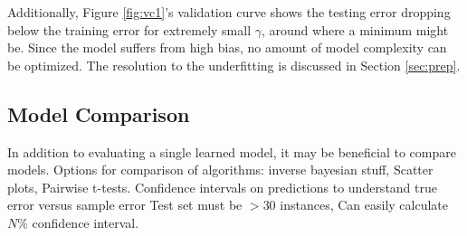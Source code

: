 Additionally, Figure \ref{fig:vc1}'s validation curve shows the testing error
dropping below the training error for extremely small $\gamma$, around where a
minimum might be.  Since the model suffers from high bias, no amount of model
complexity can be optimized. The resolution to the underfitting is discussed in
Section \ref{sec:prep}.

\subsection{Model Comparison}
\label{sec:algcompare}

In addition to evaluating a single learned model, it may be beneficial to
compare models.  Options for comparison of algorithms: inverse bayesian stuff,
Scatter plots, Pairwise t-tests. Confidence intervals on predictions to
understand true error versus sample error Test set must be $> 30$ instances,
Can easily calculate $N\%$ confidence interval.

